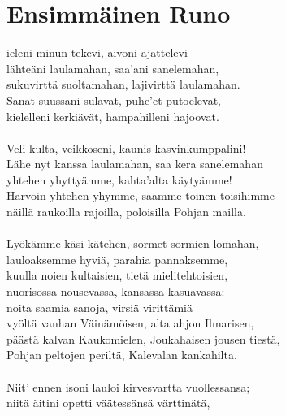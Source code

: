 
\chapter*{Ensimmäinen Runo}

ieleni minun tekevi, aivoni ajattelevi          \\
lähteäni laulamahan, saa'ani sanelemahan,				          	\\	
sukuvirttä suoltamahan, lajivirttä laulamahan.              \\
Sanat suussani sulavat, puhe'et putoelevat,                 \\
kielelleni kerkiävät, hampahilleni hajoovat.                \\
                                                            \\
Veli kulta, veikkoseni, kaunis kasvinkumppalini!            \\
Lähe nyt kanssa laulamahan, saa kera sanelemahan            \\
yhtehen yhyttyämme, kahta'alta käytyämme!                   \\
Harvoin yhtehen yhymme, saamme toinen toisihimme            \\
näillä raukoilla rajoilla, poloisilla Pohjan mailla.        \\
                                                            \\
Lyökämme käsi kätehen, sormet sormien lomahan,              \\
lauloaksemme hyviä, parahia pannaksemme,                    \\
kuulla noien kultaisien, tietä mielitehtoisien,             \\
nuorisossa nousevassa, kansassa kasuavassa:                 \\
noita saamia sanoja, virsiä virittämiä                      \\
vyöltä vanhan Väinämöisen, alta ahjon Ilmarisen,            \\
päästä kalvan Kaukomielen, Joukahaisen jousen tiestä,       \\
Pohjan peltojen periltä, Kalevalan kankahilta.              \\
                                                            \\
Niit' ennen isoni lauloi kirvesvartta vuollessansa;         \\
niitä äitini opetti väätessänsä värttinätä,                 \\
